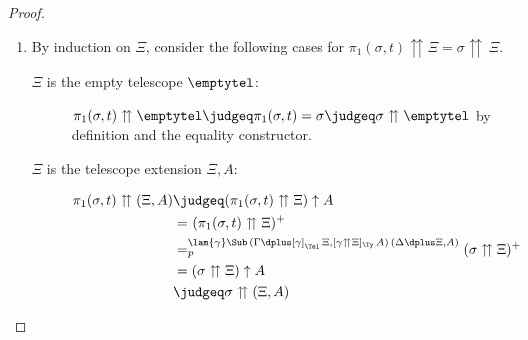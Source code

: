 \documentclass[a4paper,UKenglish,numberwithinsect,cleveref,thm-restate]{lipics-v2021}
\begin{document}
\begin{proof}
\begin{enumerate}
\begin{description}
\begin{align*}
          \end{align*}
      \end{description}
    \item By induction on $\Xi$, consider the following cases for $\pi_1(\sigma, t) \upuparrows \Xi = \sigma \upuparrows\,\Xi$.
      \begin{description}
        \item[$\Xi$ is the empty telescope $\emptytel$:] $\pi_1(\sigma, t) \upuparrows \emptytel \judgeq \pi_1(\sigma, t) = \sigma \judgeq \sigma \upuparrows \emptytel$ by definition and the equality constructor.
        \item[$\Xi$ is the telescope extension $\Xi, A$:] 
          \begin{align*}
            \pi_1(\sigma, t) \upuparrows (\Xi, A) & \judgeq (\pi_1(\sigma, t) \upuparrows \Xi) \uparrow A \\
                                                  & =^{} (\pi_1(\sigma, t) \upuparrows \Xi)^{+} \\
                                                  & =^{\lam{\gamma}\Sub\,(\Gamma\dplus[\gamma]_{\Tel}\,\Xi, [\gamma \upuparrows \Xi]_{\Ty}\,A)\,(\Delta \dplus \Xi, A)}_{p} (\sigma\upuparrows \Xi)^{+} \\
                                                  & = (\sigma \upuparrows \Xi) \uparrow A \\
                                                  & \judgeq \sigma \upuparrows (\Xi , A)
          \end{align*}
      \end{description}
  \end{enumerate}
  
\end{proof}
\end{document}
